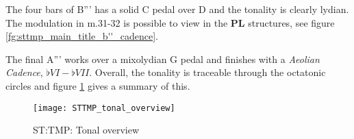 The four bars of B''' has a solid C pedal over D and the tonality is clearly lydian. The modulation in m.31-32 is possible to view in the \textbf{PL} structures, see figure \ref{fg:sttmp_main_title_b''_cadence}. 

The final A''' works over a mixolydian G pedal and finishes with a \textit{Aeolian Cadence}, \(\flat{VI}-\flat{VII}\). Overall, the tonality is traceable through the octatonic circles and figure \ref{STTMP_tonal_overview} gives a summary of this.

\clearpage
\begin{figure}
\center
\texttt{[image: STTMP\_tonal\_overview]}
	\caption{ST:TMP: Tonal overview}
	\label{STTMP_tonal_overview}
\end{figure}


\clearpage


